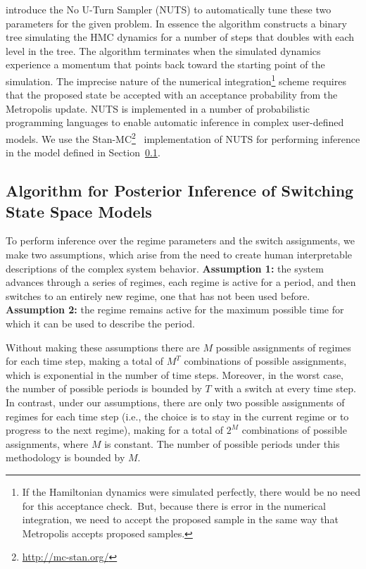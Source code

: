\cite{hoffman2014no} introduce the No U-Turn Sampler (NUTS) to automatically tune these two parameters for the given problem. In essence the algorithm constructs a binary tree simulating the HMC dynamics for a number of steps that doubles with each level in the tree. The algorithm terminates when the simulated dynamics experience a momentum that points back toward the starting point of the simulation. The imprecise nature of the numerical integration\footnote{If the Hamiltonian dynamics were simulated perfectly, there would be no need for this acceptance check.~But, because there is error in the numerical integration, we need to accept the proposed sample in the same way that Metropolis accepts proposed samples.} scheme requires that the proposed state be accepted with an acceptance probability from the Metropolis update. NUTS is implemented in a number of probabilistic programming languages to enable automatic inference in complex user-defined models. We use the Stan-MC\footnote{\url{http://mc-stan.org/}}~\citep{carpenter2016stan} implementation of NUTS for performing inference in the model defined in Section~\ref{sec:posterior_inference_sssm}.

\subsection{Algorithm for Posterior Inference of Switching State Space Models}\label{sec:posterior_inference_sssm}

To perform inference over the regime parameters and the switch assignments, we make two assumptions, which arise from the need to create human interpretable descriptions of the complex system behavior. \textbf{Assumption 1:} the system advances through a series of regimes, each regime is active for a period, and then switches to an entirely new regime, one that has not been used before. \textbf{Assumption 2:} the regime remains active for the maximum possible time for which it can be used to describe the period.

Without making these assumptions there are $M$ possible assignments of regimes for each time step, making a total of $M^T$ combinations of possible assignments, which is exponential in the number of time steps. Moreover, in the worst case, the number of possible periods is bounded by $T$ with a switch at every time step. In contrast, under our assumptions, there are only two possible assignments of regimes for each time step (i.e., the choice is to stay in the current regime or to progress to the next regime), making for a total of $2^M$ combinations of possible assignments, where $M$ is constant.  The number of possible periods under this methodology is bounded by $M$.

